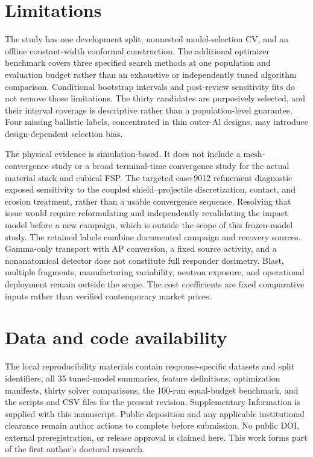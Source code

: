\documentclass[12pt]{elsarticle}
\begin{document}
\section*{Limitations}
The study has one development split, nonnested model-selection CV, and an offline constant-width conformal construction. The additional optimizer benchmark covers three specified search methods at one population and evaluation budget rather than an exhaustive or independently tuned algorithm comparison. Conditional bootstrap intervals and post-review sensitivity fits do not remove those limitations. The thirty candidates are purposively selected, and their interval coverage is descriptive rather than a population-level guarantee. Four missing ballistic labels, concentrated in thin outer-Al designs, may introduce design-dependent selection bias.

The physical evidence is simulation-based. It does not include a mesh-convergence study or a broad terminal-time convergence study for the actual material stack and cubical FSP. The targeted case-9012 refinement diagnostic exposed sensitivity to the coupled shield--projectile discretization, contact, and erosion treatment, rather than a usable convergence sequence. Resolving that issue would require reformulating and independently revalidating the impact model before a new campaign, which is outside the scope of this frozen-model study. The retained labels combine documented campaign and recovery sources. Gamma-only transport with AP conversion, a fixed source activity, and a nonanatomical detector does not constitute full responder dosimetry. Blast, multiple fragments, manufacturing variability, neutron exposure, and operational deployment remain outside the scope. The cost coefficients are fixed comparative inputs rather than verified contemporary market prices.

\section*{Data and code availability}
The local reproducibility materials contain response-specific datasets and split identifiers, all 35 tuned-model summaries, feature definitions, optimization manifests, thirty solver comparisons, the 100-run equal-budget benchmark, and the scripts and CSV files for the present revision. Supplementary Information is supplied with this manuscript. Public deposition and any applicable institutional clearance remain author actions to complete before submission. No public DOI, external preregistration, or release approval is claimed here. This work forms part of the first author's doctoral research.
\end{document}
